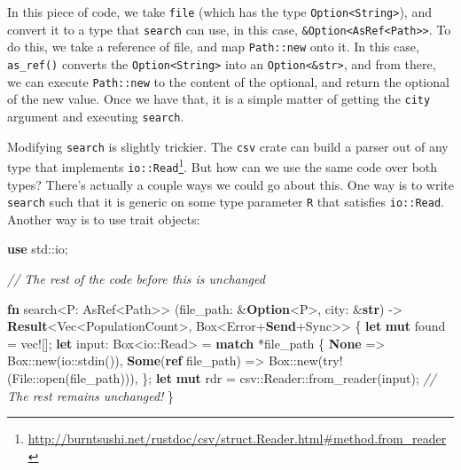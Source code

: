 \documentclass[a4paper,]{book}
\newenvironment{Shaded}{\begin{snugshade}}{\end{snugshade}}
\newcommand{\KeywordTok}[1]{\textcolor[rgb]{0.13,0.29,0.53}{\textbf{{#1}}}}
\newcommand{\CommentTok}[1]{\textcolor[rgb]{0.56,0.35,0.01}{\textit{{#1}}}}
\newcommand{\OtherTok}[1]{\textcolor[rgb]{0.56,0.35,0.01}{{#1}}}
\newcommand{\NormalTok}[1]{{#1}}
\renewcommand{\href}[2]{#2\footnote{\url{#1}}}
\begin{document}
In this piece of code, we take \texttt{file} (which has the type
\texttt{Option\textless{}String\textgreater{}}), and convert it to a
type that \texttt{search} can use, in this case,
\texttt{\&Option\textless{}AsRef\textless{}Path\textgreater{}\textgreater{}}.
To do this, we take a reference of file, and map \texttt{Path::new} onto
it. In this case, \texttt{as\_ref()} converts the
\texttt{Option\textless{}String\textgreater{}} into an
\texttt{Option\textless{}\&str\textgreater{}}, and from there, we can
execute \texttt{Path::new} to the content of the optional, and return
the optional of the new value. Once we have that, it is a simple matter
of getting the \texttt{city} argument and executing \texttt{search}.

Modifying \texttt{search} is slightly trickier. The \texttt{csv} crate
can build a parser out of
\href{http://burntsushi.net/rustdoc/csv/struct.Reader.html\#method.from_reader}{any
type that implements \texttt{io::Read}}. But how can we use the same
code over both types? There's actually a couple ways we could go about
this. One way is to write \texttt{search} such that it is generic on
some type parameter \texttt{R} that satisfies \texttt{io::Read}. Another
way is to use trait objects:

\begin{Shaded}
\begin{Highlighting}[]
\KeywordTok{use} \NormalTok{std::io;}

\CommentTok{// The rest of the code before this is unchanged}

\KeywordTok{fn} \NormalTok{search<P: AsRef<Path>>}
         \NormalTok{(file_path: &}\KeywordTok{Option}\NormalTok{<P>, city: &}\KeywordTok{str}\NormalTok{)}
         \NormalTok{-> }\KeywordTok{Result}\NormalTok{<Vec<PopulationCount>, Box<Error+}\KeywordTok{Send}\NormalTok{+Sync>> \{}
    \KeywordTok{let} \KeywordTok{mut} \NormalTok{found = }\OtherTok{vec!}\NormalTok{[];}
    \KeywordTok{let} \NormalTok{input: Box<io::Read> = }\KeywordTok{match} \NormalTok{*file_path \{}
        \KeywordTok{None} \NormalTok{=> Box::new(io::stdin()),}
        \KeywordTok{Some}\NormalTok{(}\KeywordTok{ref} \NormalTok{file_path) => Box::new(}\OtherTok{try!}\NormalTok{(File::open(file_path))),}
    \NormalTok{\};}
    \KeywordTok{let} \KeywordTok{mut} \NormalTok{rdr = csv::Reader::from_reader(input);}
    \CommentTok{// The rest remains unchanged!}
\NormalTok{\}}
\end{Highlighting}
\end{Shaded}
\end{document}
